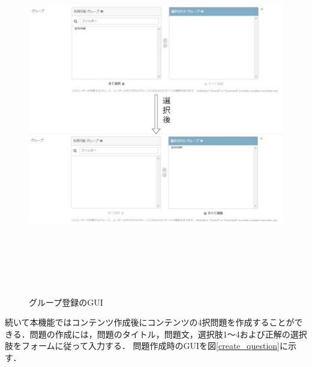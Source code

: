 \begin{figure}[htbp]
    \begin{center}
        \includegraphics[width=16cm,height=15cm,keepaspectratio]{group_register-crop.pdf}\\
    \end{center}
    \caption{グループ登録のGUI}
    \label{group_register}
\end{figure}

\newpage
続いて本機能ではコンテンツ作成後にコンテンツの4択問題を作成することができる．問題の作成には，問題のタイトル，問題文，選択肢1～4および正解の選択肢をフォームに従って入力する．
問題作成時のGUIを図\ref{create_question}に示す．

